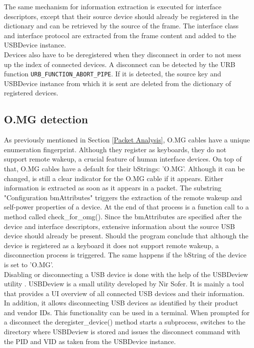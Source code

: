 The same mechanism for information extraction is executed for interface descriptors, except that their source device should already be registered in the dictionary and can be retrieved by the source of the frame. The interface class and interface protocol are extracted from the frame content and added to the USBDevice instance.\\
Devices also have to be deregistered when they disconnect in order to not mess up the index of connected devices. A disconnect can be detected by the URB function \verb|URB_FUNCTION_ABORT_PIPE|. If it is detected, the source key and USBDevice instance from which it is sent are deleted from the dictionary of registered devices.


\subsection{O.MG detection}

As previously mentioned in Section \ref{Packet Analysis}, O.MG cables have a unique enumeration fingerprint. Although they register as keyboards, they do not support remote wakeup, a crucial feature of human interface devices. On top of that, O.MG cables have a default for their bStrings: 'O.MG'. Although it can be changed, is still a clear indicator for the O.MG cable if it appears. Either information is extracted as soon as it appears in a packet. The substring "Configuration bmAttributes" triggers the extraction of the remote wakeup and self-power properties of a device. At the end of that process is a function call to a method called check\_for\_omg(). Since the bmAttributes are specified after the device and interface descriptors, extensive information about the source USB device should already be present. Should the program conclude that although the device is registered as a keyboard it does not support remote wakeup, a disconnection process is triggered. The same happens if the bString of the device is set to 'O.MG'. \\
Disabling or disconnecting a USB device is done with the help of the USBDeview utility \cite{ViewAnyInstalled}. USBDeview is a small utility developed by Nir Sofer. It is mainly a tool that provides a UI overview of all connected USB devices and their information. In addition, it allows disconnecting USB devices as identified by their product and vendor IDs. This functionality can be used in a terminal. When prompted for a disconnect the deregister\_device() method starts a subprocess, switches to the directory where USBDeview is stored and issues the disconnect command with the PID and VID as taken from the USBDevice instance.

